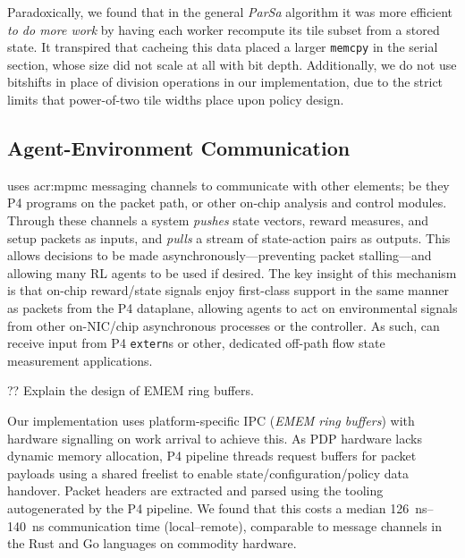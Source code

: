 Paradoxically, we found that in the general \emph{ParSa} algorithm it was more efficient \emph{to do more work} by having each worker recompute its tile subset from a stored state.
It transpired that cacheing this data placed a larger \texttt{memcpy} in the serial section, whose size did not scale at all with bit depth.
Additionally, we do not use bitshifts in place of division operations in our implementation, due to the strict limits that power-of-two tile widths place upon policy design.

\subsection{Agent-Environment Communication}\label{sec:agent-environment-communication}
\approachshort{} uses \gls{acr:mpmc} messaging channels to communicate with other elements; be they P4 programs on the packet path, or other on-chip analysis and control modules.
Through these channels a system \emph{pushes} state vectors, reward measures, and setup packets as inputs, and \emph{pulls} a stream of state-action pairs as outputs.
This allows decisions to be made asynchronously---preventing packet stalling---and allowing many RL agents to be used if desired.
The key insight of this mechanism is that on-chip reward/state signals enjoy first-class support in the same manner as packets from the P4 dataplane, allowing agents to act on environmental signals from other on-NIC/chip asynchronous processes or the controller.
As such, \approachshort{} can receive input from P4 \texttt{extern}s or other, dedicated off-path flow state measurement applications.

?? Explain the design of EMEM ring buffers.

Our implementation uses platform-specific IPC (\emph{EMEM ring buffers}) with hardware signalling on work arrival to achieve this.
As PDP hardware lacks dynamic memory allocation, P4 pipeline threads request buffers for packet payloads using a shared freelist to enable state/configuration/policy data handover.
Packet headers are extracted and parsed using the tooling autogenerated by the P4 pipeline.
We found that this costs a median \qtyrange{126}{140}{\nano\second} communication time (local--remote), comparable to message channels in the Rust and Go languages on commodity hardware.


